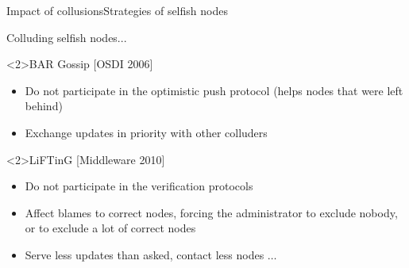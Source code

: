 \documentclass[10pt]{beamer}
\begin{document}
\begin{frame}{Impact of collusions}{Strategies of selfish nodes}
      
       {
            \begin{block}{}
      Colluding selfish nodes...
      \end{block}
      }
    
      \begin{block}<2>{BAR Gossip [OSDI 2006]}
         \begin{itemize}
            \item Do not participate in the optimistic push protocol (helps nodes that were left behind)
            \item Exchange updates in priority with other colluders
         \end{itemize}
      \end{block}
      
      \begin{block}<2>{LiFTinG [Middleware 2010]}
         \begin{itemize}
            \item Do not participate in the verification protocols
            \item Affect blames to correct nodes, forcing the administrator to exclude nobody, or to exclude a lot of correct nodes
            \item Serve less updates than asked, contact less nodes $\hdots$
         \end{itemize}
      \end{block}
\end{frame}
\end{document}
